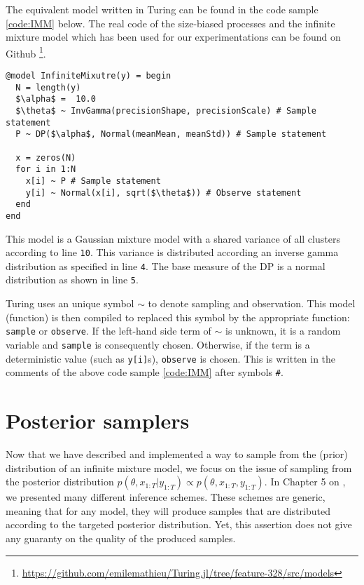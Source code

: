 The equivalent model written in Turing can be found in the code sample \ref{code:IMM} below.
The real code of the size-biased processes and the infinite mixture model which has been used for our experimentations can be found on Github \footnote{\url{https://github.com/emilemathieu/Turing.jl/tree/feature-328/src/models}}.

\begin{lstlisting}[caption={Nonconjugate infinite mixture model written in Turing.jl.},captionpos=b,label=code:IMM]
@model InfiniteMixutre(y) = begin
  N = length(y)
  $\alpha$ =  10.0
  $\theta$ ~ InvGamma(precisionShape, precisionScale) # Sample statement
  P ~ DP($\alpha$, Normal(meanMean, meanStd)) # Sample statement

  x = zeros(N)
  for i in 1:N
    x[i] ~ P # Sample statement
    y[i] ~ Normal(x[i], sqrt($\theta$)) # Observe statement
  end
end
\end{lstlisting}

This model is a Gaussian mixture model with a shared variance of all clusters according to line \texttt{10}. This variance is distributed according an inverse gamma distribution as specified in line \texttt{4}.
The base measure of the \gls{DP} is a normal distribution as shown in line \texttt{5}.

Turing uses an unique symbol \texttt{$\sim$} to denote sampling and observation. This model (function) is then compiled to replaced this symbol by the appropriate function: \texttt{sample} or \texttt{observe}. If the left-hand side term of \texttt{$\sim$} is unknown, it is a random variable and \texttt{sample} is consequently chosen. Otherwise, if the term is a deterministic value (such as \texttt{y[i]}s), \texttt{observe} is chosen. This is written in the comments of the above code sample \ref{code:IMM} after symbols \texttt{\#}.

\section{Posterior samplers} \label{sec:posterior_sampler}

Now that we have described and implemented a way to sample from the (prior) distribution of an infinite mixture model, we focus on the issue of sampling from the posterior distribution $ p(\theta, x_{1:T}|y_{1:T}) \propto p(\theta, x_{1:T},y_{1:T})$. In Chapter 5 on , we presented many different inference schemes. These schemes are generic, meaning that for any model, they will produce samples that are distributed according to the targeted posterior distribution. Yet, this assertion does not give any guaranty on the quality of the produced samples.

